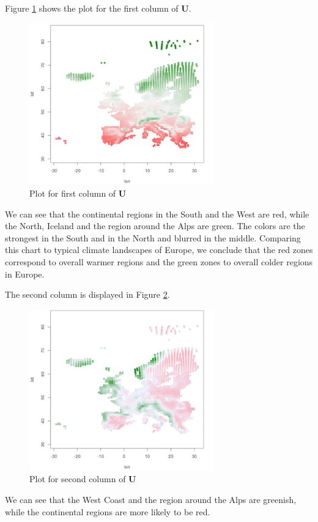 \documentclass{support/acm_proc_article-sp}
\begin{document}
    Figure \ref{fig:2c-1} shows the plot for the first column of $\mathbf{U}$.
    \begin{figure}[!htbp]
        \centering
        \includegraphics[width=8cm]{images/2c-1.png}
        \caption{Plot for first column of $\mathbf{U}$}
        \label{fig:2c-1}
    \end{figure}
    We can see that the continental regions in the South and the West are red, while the North, Iceland and the region
    around the Alps are green.
    The colors are the strongest in the South and in the North and blurred in the middle.
    Comparing this chart to typical climate landscapes of Europe, we conclude that the red zones correspond to overall
    warmer regions and the green zones to overall colder regions in Europe.

    The second column is displayed in Figure \ref{fig:2c-2}.
    \begin{figure}[!htbp]
        \centering
        \includegraphics[width=8cm]{images/2c-2.png}
        \caption{Plot for second column of $\mathbf{U}$}
        \label{fig:2c-2}
    \end{figure}
    We can see that the West Coast and the region around the Alps are greenish, while the continental regions are more likely
    to be red.
\end{document}
